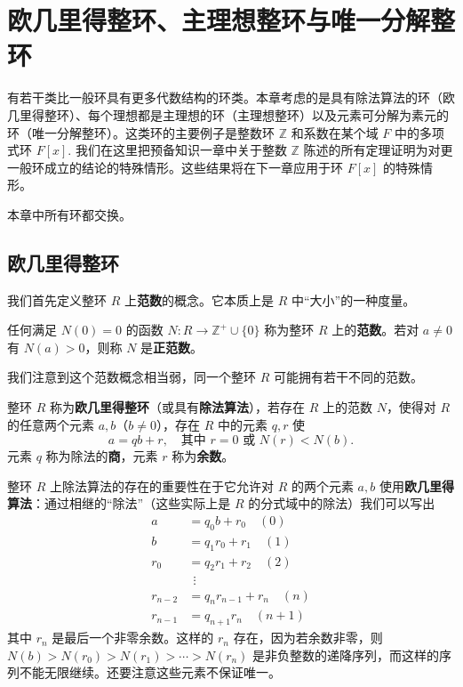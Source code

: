 

\setcounter{chapter}{7}

\chapter{欧几里得整环、主理想整环与唯一分解整环}

有若干类比一般环具有更多代数结构的环类。本章考虑的是具有除法算法的环（欧几里得整环）、每个理想都是主理想的环（主理想整环）以及元素可分解为素元的环（唯一分解整环）。这类环的主要例子是整数环 \(\mathbb{Z}\) 和系数在某个域 \(F\) 中的多项式环 \(F[x]\). 我们在这里把预备知识一章中关于整数 \(\mathbb{Z}\) 陈述的所有定理证明为对更一般环成立的结论的特殊情形。这些结果将在下一章应用于环 \(F[x]\) 的特殊情形。

本章中所有环都交换。

\section{欧几里得整环}

我们首先定义整环 \(R\) 上\textbf{范数}的概念。它本质上是 \(R\) 中“大小”的一种度量。

\begin{definition}
任何满足 \(N(0) = 0\) 的函数 \(N : R \to \mathbb{Z}^+ \cup \{0\}\) 称为整环 \(R\) 上的\textbf{范数}。若对 \(a \neq 0\) 有 \(N(a) > 0\)，则称 \(N\) 是\textbf{正范数}。
\end{definition}

我们注意到这个范数概念相当弱，同一个整环 \(R\) 可能拥有若干不同的范数。

\begin{definition}
整环 \(R\) 称为\textbf{欧几里得整环}（或具有\textbf{除法算法}），若存在 \(R\) 上的范数 \(N\)，使得对 \(R\) 的任意两个元素 \(a, b\)（\(b \neq 0\)），存在 \(R\) 中的元素 \(q, r\) 使
\[
a = qb + r, \quad \text{其中 } r = 0 \text{ 或 } N(r) < N(b).
\]
元素 \(q\) 称为除法的\textbf{商}，元素 \(r\) 称为\textbf{余数}。
\end{definition}

整环 \(R\) 上除法算法的存在的重要性在于它允许对 \(R\) 的两个元素 \(a, b\) 使用\textbf{欧几里得算法}：通过相继的“除法”（这些实际上是 \(R\) 的分式域中的除法）我们可以写出
\[
\begin{aligned}
a &= q_0b + r_0 \quad (0)\\
b &= q_1r_0 + r_1 \quad (1)\\
r_0 &= q_2r_1 + r_2 \quad (2)\\
&\ \ \vdots \\
r_{n-2} &= q_nr_{n-1} + r_n \quad (n)\\
r_{n-1} &= q_{n+1}r_n \quad (n+1)
\end{aligned}
\]
其中 \(r_n\) 是最后一个非零余数。这样的 \(r_n\) 存在，因为若余数非零，则 \(N(b) > N(r_0) > N(r_1) > \cdots > N(r_n)\) 是非负整数的递降序列，而这样的序列不能无限继续。还要注意这些元素不保证唯一。

